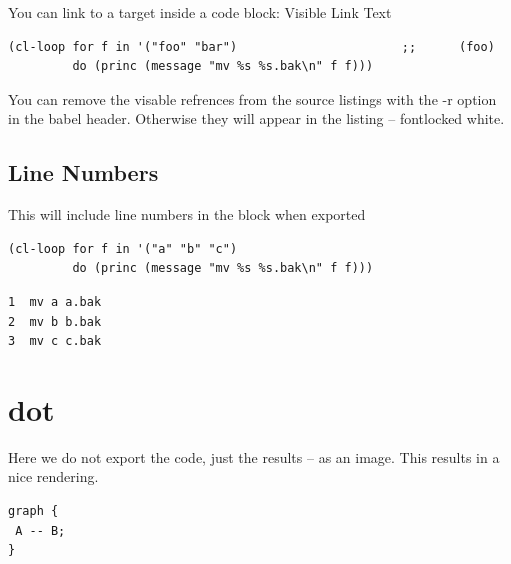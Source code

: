 \documentclass[11pt]{article}
\begin{document}
You can link to a target inside a code block: Visible Link Text

\begin{verbatim}
(cl-loop for f in '("foo" "bar")                       ;;      (foo)
         do (princ (message "mv %s %s.bak\n" f f)))
\end{verbatim}

You can remove the visable refrences from the source listings with the -r option in the babel header.  Otherwise they will appear in the listing -- fontlocked
white.

\subsection{Line Numbers}
\label{sec:orgd93d02e}

This will include line numbers in the block when exported

\begin{verbatim}
(cl-loop for f in '("a" "b" "c")
         do (princ (message "mv %s %s.bak\n" f f)))
\end{verbatim}

\begin{verbatim}
1  mv a a.bak
2  mv b b.bak
3  mv c c.bak
\end{verbatim}

\section{dot}
\label{sec:orge905fb3}

Here we do not export the code, just the results -- as an image.  This results in a nice rendering.

\begin{verbatim}
graph {
 A -- B;
}
\end{verbatim}
\end{document}
